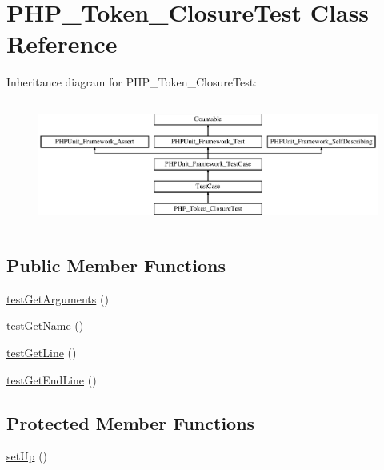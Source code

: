 \hypertarget{class_p_h_p___token___closure_test}{}\section{P\+H\+P\+\_\+\+Token\+\_\+\+Closure\+Test Class Reference}
\label{class_p_h_p___token___closure_test}
Inheritance diagram for P\+H\+P\+\_\+\+Token\+\_\+\+Closure\+Test\+:\begin{figure}[H]
\begin{center}
\leavevmode
\includegraphics[height=4.129793cm]{class_p_h_p___token___closure_test}
\end{center}
\end{figure}
\subsection*{Public Member Functions}
\begin{DoxyCompactItemize}
\item 
\mbox{\hyperlink{class_p_h_p___token___closure_test_a8d82fab2979421a0bbb9e3315599a10f}{test\+Get\+Arguments}} ()
\item 
\mbox{\hyperlink{class_p_h_p___token___closure_test_a20d1601e22a17dad9eb8c9050676ef70}{test\+Get\+Name}} ()
\item 
\mbox{\hyperlink{class_p_h_p___token___closure_test_adec279f2d758882ab4b28cd8f77a6be1}{test\+Get\+Line}} ()
\item 
\mbox{\hyperlink{class_p_h_p___token___closure_test_a0d912911a630087e21244feb63123cc8}{test\+Get\+End\+Line}} ()
\end{DoxyCompactItemize}
\subsection*{Protected Member Functions}
\begin{DoxyCompactItemize}
\item 
\mbox{\hyperlink{class_p_h_p___token___closure_test_a0bc688732d2b3b162ffebaf7812e78da}{set\+Up}} ()
\end{DoxyCompactItemize}
